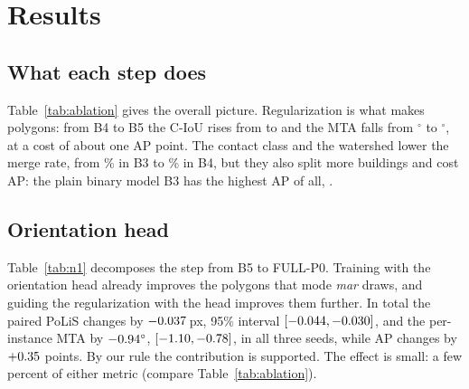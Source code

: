 \documentclass[conference]{IEEEtran}
\newcommand{\fittable}[1]{\resizebox{\ifdim\width>\textwidth\textwidth\else\width\fi}{!}{#1}}
\begin{document}
\section{Results}
\begin{table}[t]
\centering
\caption{Scenarios on the deduplicated CrowdAI test split (mean $\pm$ standard deviation over the runs). AP, IoU, C-IoU
and merge rate in percent, PoLiS in pixels, MTA in degrees. FULL+Y adds detector seeds; B3m, B3m+Y, B3$\theta'$,
B3$\theta$, B3+$\theta'$ and B3+$\theta$ are exploratory.}
\label{tab:ablation}
\resizebox{\textwidth}{!}{}
\end{table}

\subsection{What each step does}
Table~\ref{tab:ablation} gives the overall picture. Regularization is what makes polygons: from B4 to B5 the C-IoU rises
from \NCiouBfour{} to \NCiouBfive{} and the MTA falls from \NMtaBfour$^\circ$ to \NMtaBfive$^\circ$, at a cost of about
one AP point. The contact class and the watershed lower the merge rate, from \NMergeBthree\% in B3 to \NMergeBfour\% in
B4, but they also split more buildings and cost AP: the plain binary model B3 has the highest AP of all,
\NApBthree.

\subsection{Orientation head}
\label{sec:n1}
\begin{table}[t]
\centering
\caption{Paired differences in the dense stratum of the test split (\NTilesDense{} tiles, three seeds), with 95\%
bootstrap intervals.}
\label{tab:n1}
\footnotesize\fittable{}
\end{table}
Table~\ref{tab:n1} decomposes the step from B5 to FULL-P0. Training with the orientation head already improves the
polygons that mode \emph{mar} draws, and guiding the regularization with the head improves them further. In total the
paired PoLiS changes by $-0.037$\,px, 95\% interval $[-0.044, -0.030]$, and the per-instance MTA by
$-0.94^\circ$, $[-1.10, -0.78]$, in all three seeds, while AP changes by $+0.35$ points. By our rule the
contribution is supported. The effect is small: a few percent of either metric (compare Table~\ref{tab:ablation}).
\end{document}
